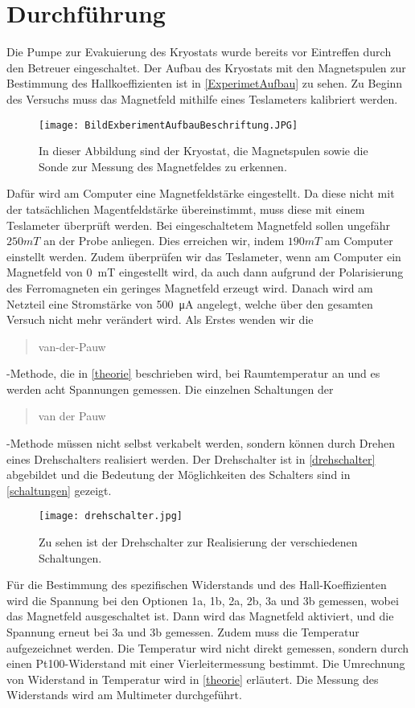 \section{Durchführung}
\noindent Die Pumpe zur Evakuierung des Kryostats wurde bereits vor Eintreffen durch den Betreuer eingeschaltet. Der Aufbau des Kryostats mit den Magnetspulen zur Bestimmung des Hallkoeffizienten ist in \autoref{ExperimetAufbau} zu sehen.  Zu Beginn des Versuchs muss das Magnetfeld mithilfe eines Teslameters kalibriert werden.

\begin{figure}[H]
    \centering
    \texttt{[image: BildExberimentAufbauBeschriftung.JPG]}
    \caption{In dieser Abbildung sind der Kryostat, die Magnetspulen sowie die Sonde zur Messung des Magnetfeldes zu erkennen.}
    \label{ExperimetAufbau}
\end{figure}

Dafür wird am Computer eine Magnetfeldstärke eingestellt. Da diese nicht mit der tatsächlichen Magentfeldstärke übereinstimmt, muss diese mit einem Teslameter überprüft werden.
Bei eingeschaltetem Magnetfeld sollen ungefähr $250 \unit{mT}$ an der Probe anliegen. Dies erreichen wir, indem $190 \unit{mT}$ am Computer einstellt werden.
Zudem überprüfen wir das Teslameter, wenn am Computer ein Magnetfeld von \SI{0}{mT} eingestellt wird, da auch dann aufgrund der Polarisierung des Ferromagneten ein geringes Magnetfeld erzeugt wird.
Danach wird am Netzteil eine Stromstärke von \SI{500}{\micro A} angelegt, welche über den gesamten Versuch nicht mehr verändert wird.
Als Erstes wenden wir die \blockquote{van-der-Pauw}-Methode, die in \autoref{theorie} beschrieben wird, bei Raumtemperatur an und es werden acht Spannungen gemessen.
Die einzelnen Schaltungen der \blockquote{van der Pauw}-Methode müssen nicht selbst verkabelt werden, sondern können durch Drehen eines Drehschalters realisiert werden.
Der Drehschalter ist in \autoref{drehschalter} abgebildet und die Bedeutung der Möglichkeiten des Schalters sind in \autoref{schaltungen} gezeigt.

\begin{figure}[H]
    \centering
    \texttt{[image: drehschalter.jpg]}
    \caption{Zu sehen ist der Drehschalter zur Realisierung der verschiedenen Schaltungen.}
   \label{drehschalter}
\end{figure}

Für die Bestimmung des spezifischen Widerstands und des Hall-Koeffizienten wird die Spannung bei den Optionen 1a, 1b, 2a, 2b, 3a und 3b gemessen, wobei das Magnetfeld ausgeschaltet ist. Dann wird das Magnetfeld aktiviert, und die Spannung erneut bei 3a und 3b gemessen.
Zudem muss die Temperatur aufgezeichnet werden.
Die Temperatur wird nicht direkt gemessen, sondern durch einen Pt100-Widerstand mit einer Vierleitermessung bestimmt.
Die Umrechnung von Widerstand in Temperatur wird in \autoref{theorie} erläutert.
Die Messung des Widerstands wird am Multimeter durchgeführt.

